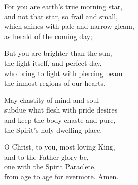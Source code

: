 

For you are earth’s true morning star,\\
and not that star, so frail and small,\\
which shines with pale and narrow gleam,\\
as herald of the coming day;

But you are brighter than the sun,\\
the light itself, and perfect day,\\
who bring to light with piercing beam\\
the inmost regions of our hearts.

May chastity of mind and soul\\
subdue what flesh with pride desires\\
and keep the body chaste and pure,\\
the Spirit’s holy dwelling place.

O Christ, to you, most loving King,\\
and to the Father glory be,\\
one with the Spirit Paraclete,\\
from age to age for evermore. Amen.